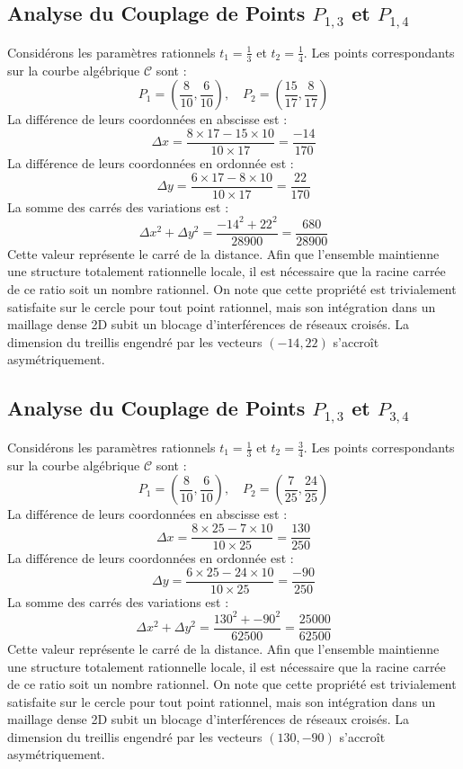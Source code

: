 \documentclass[12pt, a4paper]{article}
\begin{document}
\subsection{Analyse du Couplage de Points $P_{1,3}$ et $P_{1,4}$}
Considérons les paramètres rationnels $t_1 = \frac{1}{3}$ et $t_2 = \frac{1}{4}$.
Les points correspondants sur la courbe algébrique $\mathcal{C}$ sont :
$$ P_1 = \left( \frac{8}{10}, \frac{6}{10} \right), \quad P_2 = \left( \frac{15}{17}, \frac{8}{17} \right) $$
La différence de leurs coordonnées en abscisse est :
$$ \Delta x = \frac{8 \times 17 - 15 \times 10}{10 \times 17} = \frac{-14}{170} $$
La différence de leurs coordonnées en ordonnée est :
$$ \Delta y = \frac{6 \times 17 - 8 \times 10}{10 \times 17} = \frac{22}{170} $$
La somme des carrés des variations est :
$$ \Delta x^2 + \Delta y^2 = \frac{ -14^2 + 22^2 }{ 28900 } = \frac{ 680 }{ 28900 } $$
Cette valeur représente le carré de la distance. Afin que l'ensemble maintienne une structure totalement rationnelle locale, il est nécessaire que la racine carrée de ce ratio soit un nombre rationnel. On note que cette propriété est trivialement satisfaite sur le cercle pour tout point rationnel, mais son intégration dans un maillage dense 2D subit un blocage d'interférences de réseaux croisés. La dimension du treillis engendré par les vecteurs $( -14, 22 )$ s'accroît asymétriquement.


\subsection{Analyse du Couplage de Points $P_{1,3}$ et $P_{3,4}$}
Considérons les paramètres rationnels $t_1 = \frac{1}{3}$ et $t_2 = \frac{3}{4}$.
Les points correspondants sur la courbe algébrique $\mathcal{C}$ sont :
$$ P_1 = \left( \frac{8}{10}, \frac{6}{10} \right), \quad P_2 = \left( \frac{7}{25}, \frac{24}{25} \right) $$
La différence de leurs coordonnées en abscisse est :
$$ \Delta x = \frac{8 \times 25 - 7 \times 10}{10 \times 25} = \frac{130}{250} $$
La différence de leurs coordonnées en ordonnée est :
$$ \Delta y = \frac{6 \times 25 - 24 \times 10}{10 \times 25} = \frac{-90}{250} $$
La somme des carrés des variations est :
$$ \Delta x^2 + \Delta y^2 = \frac{ 130^2 + -90^2 }{ 62500 } = \frac{ 25000 }{ 62500 } $$
Cette valeur représente le carré de la distance. Afin que l'ensemble maintienne une structure totalement rationnelle locale, il est nécessaire que la racine carrée de ce ratio soit un nombre rationnel. On note que cette propriété est trivialement satisfaite sur le cercle pour tout point rationnel, mais son intégration dans un maillage dense 2D subit un blocage d'interférences de réseaux croisés. La dimension du treillis engendré par les vecteurs $( 130, -90 )$ s'accroît asymétriquement.
\end{document}
